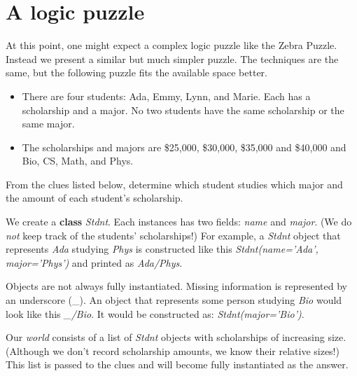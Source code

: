 \section{A logic puzzle}\label{sec:logic-puzzle}

At this point, one might expect a complex logic puzzle like the Zebra Puzzle\cite{ZebraPuzzle}. Instead we present a similar but much simpler puzzle. The techniques are the same, but the following puzzle\cite{ScholarshipPuzzle} fits the available space better. 

\begin{itemize}
    \item There are four students: Ada, Emmy, Lynn, and Marie. Each has a scholarship and a major.  No two students have the same scholarship or the same major. 
    \item The scholarships and majors are \$25,000, \$30,000, \$35,000 and \$40,000 and Bio, CS, Math, and Phys. 
\end{itemize}

From the clues listed below, determine which student studies which major and the amount of each student's scholarship.

We create a \textbf{class} \textit{Stdnt}. Each instances has two fields: \textit{name} and \textit{major}. (We do \textit{not} keep track of the students' scholarships!) For example, a \textit{Stdnt} object that represents \textit{Ada} studying \textit{Phys} is constructed like this \textit{Stdnt(name='Ada', major='Phys')} and printed as \textit{Ada/Phys}. 

Objects are not always fully instantiated. Missing information is represented by an underscore (\_). An object that represents some person studying \textit{Bio} would look like this \textit{\_/Bio}. It would be constructed as: \textit{Stdnt(major='Bio')}.

Our \textit{world} consists of a list of \textit{Stdnt} objects with scholarships of increasing size. (Although we don't record scholarship amounts, we know their relative sizes!) This list is passed to the clues and will become fully instantiated as the answer.


